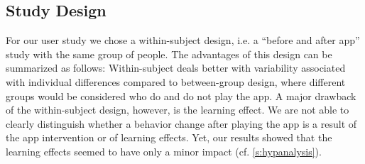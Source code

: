 \subsection{Study Design}
For our user study we chose a within-subject design, i.e. a ``before and after app'' study with the same group of people.
The advantages of this design can be summarized as follows:
Within-subject deals better with variability associated with individual differences compared to between-group design, where different groups would be considered who do and do not play the app.
A major drawback of the within-subject design, however, is the learning effect.
We are not able to clearly distinguish whether a behavior change after playing the app is a result of the app intervention or of learning effects.
Yet, our results showed that the learning effects seemed to have only a minor impact (cf. \autoref{s:hypanalysis}).

